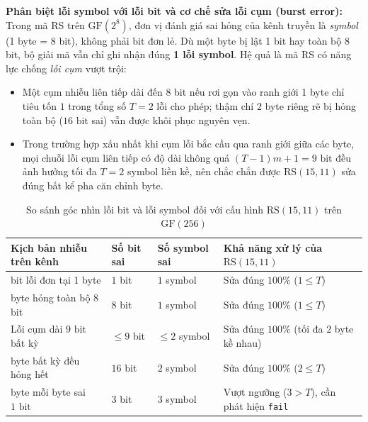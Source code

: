 \documentclass[12pt,a4paper]{report}
\begin{document}
\textbf{Phân biệt lỗi symbol với lỗi bit và cơ chế sửa lỗi cụm (burst error):} Trong mã RS trên $\text{GF}(2^8)$, đơn vị đánh giá sai hỏng của kênh truyền là \textit{symbol} (1 byte = 8 bit), không phải bit đơn lẻ. Dù một byte bị lật 1 bit hay toàn bộ 8 bit, bộ giải mã vẫn chỉ ghi nhận đúng \textbf{1 lỗi symbol}. Hệ quả là mã RS có năng lực chống \textit{lỗi cụm} vượt trội:
\begin{itemize}
    \item Một cụm nhiễu liên tiếp dài đến $8$ bit nếu rơi gọn vào ranh giới 1 byte chỉ tiêu tốn $1$ trong tổng số $T = 2$ lỗi cho phép; thậm chí $2$ byte riêng rẽ bị hỏng toàn bộ ($16\text{ bit}$ sai) vẫn được khôi phục nguyên vẹn.
    \item Trong trường hợp xấu nhất khi cụm lỗi bắc cầu qua ranh giới giữa các byte, mọi chuỗi lỗi cụm liên tiếp có độ dài không quá $(T - 1)m + 1 = 9\text{ bit}$ đều ảnh hưởng tối đa $T = 2$ symbol liền kề, nên chắc chắn được $\text{RS}(15,11)$ sửa đúng bất kể pha căn chỉnh byte.
\end{itemize}

\begin{table}[!htb]
    \centering
    \caption{So sánh góc nhìn lỗi bit và lỗi symbol đối với cấu hình $\text{RS}(15,11)$ trên $\text{GF}(256)$}
    \label{tab:bit-vs-symbol}
    \begin{tabularx}{\textwidth}{@{}>{\raggedright\arraybackslash}p{3.8cm} >{\centering\arraybackslash}p{3.0cm} >{\centering\arraybackslash}p{2.6cm} X@{}}
        \toprule
        \textbf{Kịch bản nhiễu trên kênh} & \textbf{Số bit sai} & \textbf{Số symbol sai} & \textbf{Khả năng xử lý của $\text{RS}(15,11)$} \\
        \midrule
        1 bit lỗi đơn tại 1 byte & $1$ bit & $1$ symbol & Sửa đúng $100\%$ ($1 \le T$) \\
        1 byte hỏng toàn bộ 8 bit & $8$ bit & $1$ symbol & Sửa đúng $100\%$ ($1 \le T$) \\
        Lỗi cụm dài $9\text{ bit}$ bất kỳ & $\le 9$ bit & $\le 2$ symbol & Sửa đúng $100\%$ (tối đa $2$ byte kề nhau) \\
        2 byte bất kỳ đều hỏng hết & $16$ bit & $2$ symbol & Sửa đúng $100\%$ ($2 \le T$) \\
        3 byte mỗi byte sai $1\text{ bit}$ & $3$ bit & $3$ symbol & Vượt ngưỡng ($3 > T$), cần phát hiện \texttt{fail} \\
        \bottomrule
    \end{tabularx}
\end{table}
\end{document}
